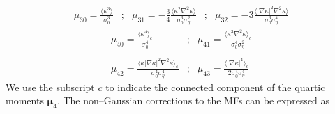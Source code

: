 \begin{equation}
\label{eq:4:skew-dimensionless}
\begin{matrix}
\displaystyle \mu_{30} = \frac{\langle\kappa^3\rangle}{\sigma_0^3} & ; & \displaystyle \mu_{31} = -\frac{3}{4} \frac{\langle\kappa^2\nabla^2\kappa\rangle}{\sigma_0^3\sigma_\eta^2} & ; & \displaystyle \mu_{32} = -3 \frac{\langle\vert\nabla\kappa\vert^2\nabla^2\kappa\rangle}{\sigma_0^3\sigma_\eta^4}
\end{matrix}
\end{equation}
%
\begin{equation}
\label{eq:4:kurt-dimensionless}
\begin{matrix}
\displaystyle \mu_{40} = \frac{\langle\kappa^4\rangle_c}{\sigma_0^4} & ; & \displaystyle \mu_{41} = \frac{\langle\kappa^3\nabla^2\kappa\rangle_c}{\sigma_0^4\sigma_\eta^2} \\ \\ 
\displaystyle \mu_{42} = \frac{\langle\kappa\vert\nabla\kappa\vert^2\nabla^2\kappa\rangle_c}{\sigma_0^4\sigma_\eta^4} & ; & \displaystyle \mu_{43} = \frac{\langle\vert\nabla\kappa\vert^4\rangle_c}{2\sigma_0^4\sigma_\eta^4}
\end{matrix}
\end{equation}
%
We use the subscript $c$ to indicate the connected component of the quartic moments $\pmb{\mu}_4$. The non--Gaussian corrections to the MFs can be expressed as 


